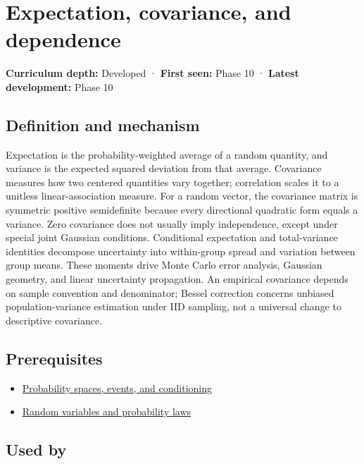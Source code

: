 \hypertarget{appendix-54c383df9992}{}
\section{Expectation, covariance, and dependence}\label{appendix-54c383df9992-expectation-covariance-and-dependence}

\textbf{Curriculum depth:} Developed · \textbf{First seen:} Phase 10 · \textbf{Latest development:} Phase 10

\subsection{Definition and mechanism}\label{appendix-54c383df9992-definition-and-mechanism}

Expectation is the probability-weighted average of a random quantity, and variance is the expected squared deviation from that average. Covariance measures how two centered quantities vary together; correlation scales it to a unitless linear-association measure. For a random vector, the covariance matrix is symmetric positive semidefinite because every directional quadratic form equals a variance. Zero covariance does not usually imply independence, except under special joint Gaussian conditions. Conditional expectation and total-variance identities decompose uncertainty into within-group spread and variation between group means. These moments drive Monte Carlo error analysis, Gaussian geometry, and linear uncertainty propagation. An empirical covariance depends on sample convention and denominator; Bessel correction concerns unbiased population-variance estimation under IID sampling, not a universal change to descriptive covariance.

\subsection{Prerequisites}\label{appendix-54c383df9992-prerequisites}

\begin{itemize}
\tightlist
\item
  \hyperref[appendix-f1ef323f6ed7]{Probability spaces, events, and conditioning}
\item
  \hyperref[appendix-4d0203f7944f]{Random variables and probability laws}
\end{itemize}

\subsection{Used by}\label{appendix-54c383df9992-used-by}

